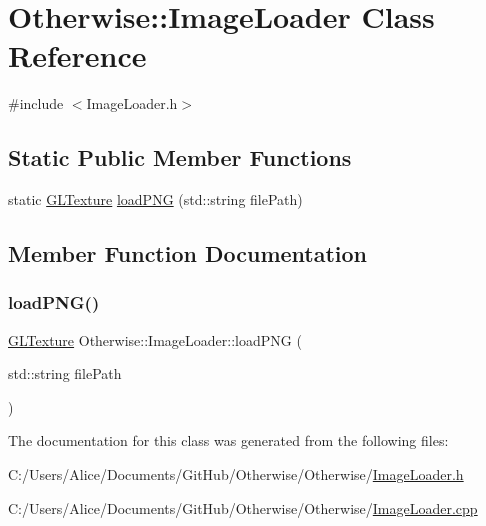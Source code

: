 \hypertarget{class_otherwise_1_1_image_loader}{}\section{Otherwise\+:\+:Image\+Loader Class Reference}
\label{class_otherwise_1_1_image_loader}


{\ttfamily \#include $<$Image\+Loader.\+h$>$}

\subsection*{Static Public Member Functions}
\begin{DoxyCompactItemize}
\item 
static \hyperlink{struct_otherwise_1_1_g_l_texture}{G\+L\+Texture} \hyperlink{class_otherwise_1_1_image_loader_aa5abf2e5b26f1927bfeed63df2aa1ef9}{load\+P\+NG} (std\+::string file\+Path)
\end{DoxyCompactItemize}


\subsection{Member Function Documentation}
\mbox{\label{class_otherwise_1_1_image_loader_aa5abf2e5b26f1927bfeed63df2aa1ef9}} 
\subsubsection{\texorpdfstring{load\+P\+N\+G()}{loadPNG()}}
{\footnotesize\ttfamily \hyperlink{struct_otherwise_1_1_g_l_texture}{G\+L\+Texture} Otherwise\+::\+Image\+Loader\+::load\+P\+NG (\begin{DoxyParamCaption}\item[{std\+::string}]{file\+Path }\end{DoxyParamCaption})\hspace{0.3cm}{\ttfamily [static]}}



The documentation for this class was generated from the following files\+:\begin{DoxyCompactItemize}
\item 
C\+:/\+Users/\+Alice/\+Documents/\+Git\+Hub/\+Otherwise/\+Otherwise/\hyperlink{_image_loader_8h}{Image\+Loader.\+h}\item 
C\+:/\+Users/\+Alice/\+Documents/\+Git\+Hub/\+Otherwise/\+Otherwise/\hyperlink{_image_loader_8cpp}{Image\+Loader.\+cpp}\end{DoxyCompactItemize}
